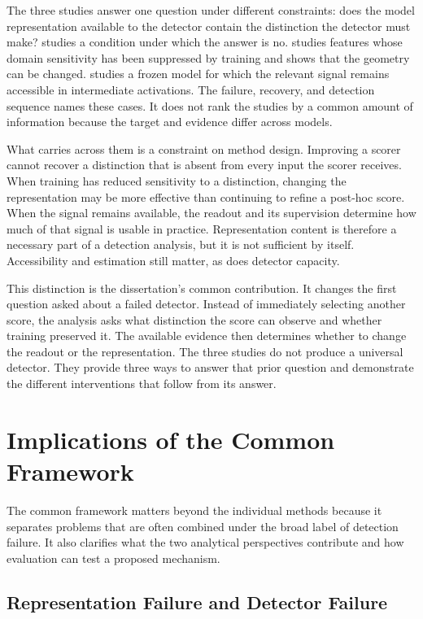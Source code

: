 The three studies answer one question under different constraints: does the model
representation available to the detector contain the distinction the detector must
make?  studies a condition under which the answer is no.
 studies features whose domain sensitivity has
been suppressed by training and shows that the geometry can be changed.
 studies a frozen model for which the relevant
signal remains accessible in intermediate activations. The failure, recovery, and
detection sequence names these cases. It does not rank the studies by a common
amount of information because the target and evidence differ across models.

What carries across them is a constraint on method design. Improving a scorer
cannot recover a distinction that is absent from every input the scorer receives.
When training has reduced sensitivity to a distinction, changing the representation
may be more effective than continuing to refine a post-hoc score. When the signal
remains available, the readout and its supervision determine how much of that signal
is usable in practice. Representation content is therefore a necessary part of a
detection analysis, but it is not sufficient by itself. Accessibility and
estimation still matter, as does detector capacity.

This distinction is the dissertation's common contribution. It changes the first
question asked about a failed detector. Instead of immediately selecting another
score, the analysis asks what distinction the score can observe and whether training
preserved it. The available evidence then determines whether to change the readout
or the representation. The three studies do not produce a universal detector. They
provide three ways to answer that prior question and demonstrate the different
interventions that follow from its answer.

\section{Implications of the Common Framework}
\label{sec:concl:implications}

The common framework matters beyond the individual methods because it separates
problems that are often combined under the broad label of detection failure. It
also clarifies what the two analytical perspectives contribute and how evaluation
can test a proposed mechanism.

\subsection{Representation Failure and Detector Failure}
\label{subsec:concl:representation}

